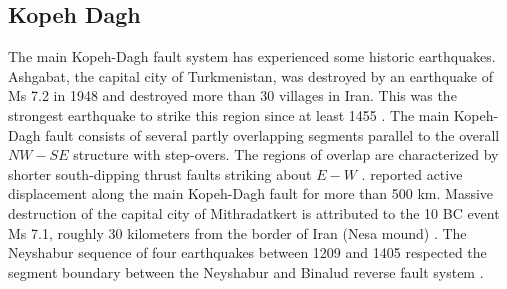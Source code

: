 \subsection{Kopeh Dagh}
The main Kopeh-Dagh fault system has experienced some historic earthquakes. Ashgabat, the capital city of Turkmenistan, was destroyed by an earthquake of Ms 7.2 in 1948 and destroyed more than 30 villages in Iran. This was the strongest earthquake to strike this region since at least 1455 \citep{Berberian2001}.
The main Kopeh-Dagh fault consists of several partly overlapping segments parallel to the overall $NW - SE$ structure with step-overs. The regions of overlap are characterized by shorter south-dipping thrust faults striking about $E - W$ \citep{Berberian2001}. \citet{Trifonov1978} reported active displacement along the main Kopeh-Dagh fault for more than 500 km. 
Massive destruction of the capital city of Mithradatkert is attributed to the 10 BC event Ms 7.1, roughly 30 kilometers from the border of Iran (Nesa mound) \citep{Berberian2001}.
The Neyshabur sequence of four earthquakes between 1209 and 1405 respected the segment boundary between the Neyshabur and Binalud reverse fault system \citep{Berberian1999}.


